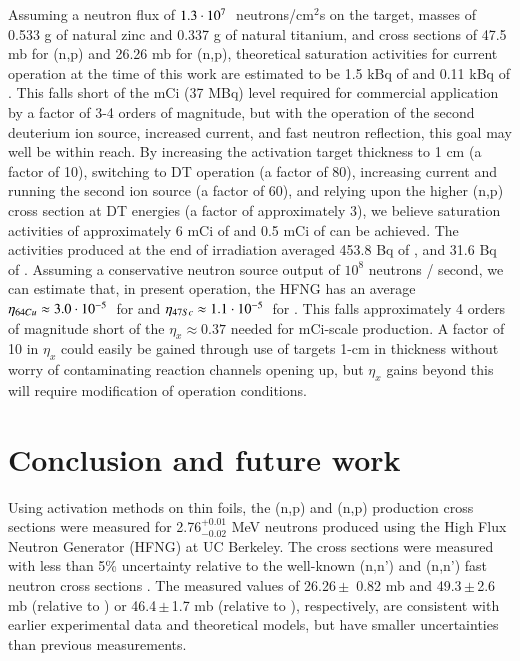 Assuming a neutron flux of  $1.3 \cdot 10^{7}\ $ neutrons/cm$^2$s on the target, masses of 0.533 g of natural zinc and 0.337 g of natural titanium, and cross sections of 47.5 mb for (n,p)   and 26.26  mb for  (n,p), theoretical saturation activities for current operation at the time of this work are estimated to be 1.5 kBq of  and 0.11 kBq of .
This falls short of the mCi (37 MBq) level required for commercial application by a factor of 3-4 orders of magnitude, but with the operation of the second deuterium ion source, increased current, and fast neutron reflection, this goal may  well be within reach. 
By increasing the activation target thickness to 1 cm (a factor of 10), switching to DT operation (a factor of 80), increasing current and running the second ion source (a factor of 60), and relying upon the higher (n,p) cross section at DT energies (a factor of approximately 3), we believe saturation activities of approximately 6 mCi of  and 0.5 mCi of  can be achieved.  
The activities produced at the end of irradiation averaged 453.8 Bq of , and 31.6 Bq of .
Assuming a conservative neutron source output of $10^8$ neutrons / second, we can estimate that, in present operation, the HFNG has an average $\eta_{64Cu} \approx 3.0 \cdot 10^{-5}\ $ for  and $\eta_{47Sc} \approx 1.1 \cdot 10^{-5}\ $ for  . 
This falls approximately 4 orders of magnitude short of the $\eta_x \approx 0.37$ needed for mCi-scale production.
A factor of 10 in $\eta_x$ could easily be gained through use of targets  1-cm in thickness without worry of contaminating reaction channels opening up, but $\eta_x$ gains beyond this will require modification of operation conditions.   
 
 
 
 \section{Conclusion and future work}

Using activation methods on thin foils, the (n,p) and (n,p) production cross sections were measured for  2.76$^{+0.01}_{-0.02}$ MeV neutrons produced using the High Flux Neutron Generator (HFNG) at UC Berkeley.
The cross sections were measured with less than  5\% uncertainty relative to the well-known (n,n') and (n,n') fast neutron cross sections \cite{Capote2012,zsolnay2012technical}.
The measured values of  26.26\,$\pm$\, 0.82 mb and  49.3\,$\pm$\,2.6 mb (relative to ) or 46.4\,$\pm$\,1.7 mb (relative to ), respectively, are consistent with earlier experimental data and theoretical models, but have smaller uncertainties than previous measurements.
 
